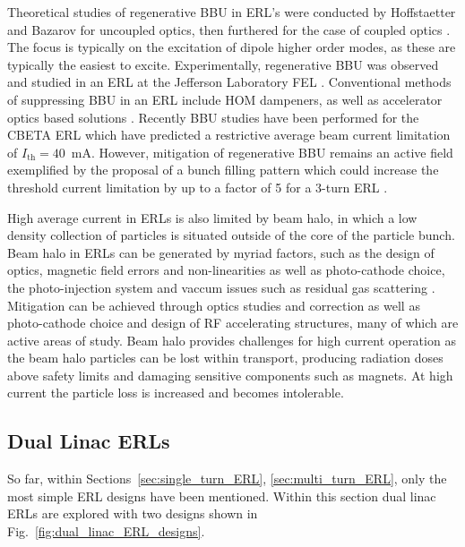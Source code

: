 \documentclass[../main.tex]{subfiles}
\begin{document}
Theoretical studies of regenerative BBU in ERL's were conducted by Hoffstaetter and Bazarov \cite{hoffstaetter2004beam} for uncoupled optics, then furthered for the case of coupled optics \cite{hoffstaetter2007recirculating}. The focus is typically on the excitation of dipole higher order modes, as these are typically the easiest to excite. Experimentally, regenerative BBU was observed and studied in an ERL at the Jefferson Laboratory FEL \cite{tennant2005first,douglas2006experimental}. Conventional methods of suppressing BBU \cite{tennant2004methods} in an ERL include HOM dampeners, as well as accelerator optics based solutions \cite{rand1980beam}. Recently BBU studies have been performed for the CBETA ERL \cite{lou2019beam} which have predicted a restrictive average beam current limitation of $I_{\mathrm{th}} = 40$~\si{\milli\ampere}. However, mitigation of regenerative BBU remains an active field exemplified by the proposal of a bunch filling pattern which could increase the threshold current limitation by up to a factor of 5 for a 3-turn ERL \cite{setiniyaz2021filling}.    

High average current in ERLs is also limited by beam halo, in which a low density collection of particles is situated outside of the core of the particle bunch. Beam halo in ERLs can be generated by myriad factors, such as the design of optics, magnetic field errors and non-linearities as well as photo-cathode choice, the photo-injection system and vaccum issues such as residual gas scattering \cite{neil2006jlab,tanaka2018new}. Mitigation can be achieved through optics studies and correction as well as photo-cathode choice and design of RF accelerating structures, many of which are active areas of study. Beam halo provides challenges for high current operation as the beam halo particles can be lost within transport, producing radiation doses above safety limits and damaging sensitive components such as magnets. At high current the particle loss is increased and becomes intolerable.

\subsection{Dual Linac ERLs}
\label{sec:dual_linac_ERL}

So far, within Sections~\ref{sec:single_turn_ERL}, \ref{sec:multi_turn_ERL}, only the most simple ERL designs have been mentioned. Within this section dual linac ERLs are explored with two designs shown in Fig.~\ref{fig:dual_linac_ERL_designs}.
\end{document}
